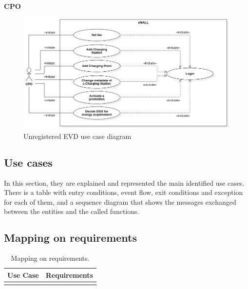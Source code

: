 \textbf{CPO}
\begin{figure} [H]
    \begin{center}
        \includegraphics[width=0.9\linewidth]{Images/UseCaseDiagrams/CPO_use_case_diagram}
        \caption{Unregistered EVD use case diagram}
        \label{fig: cpo_diag}
    \end{center}
\end{figure}

\subsection{Use cases}
\label{subsec: use_cases}%
In this section, they are explained and represented the main identified use cases.
There is a table with entry conditions, event flow, exit conditions and exception for each of them, and a sequence diagram
that shows the messages exchanged between the entities and the called functions.

\subsection{Mapping on requirements}
\label{subsec: map_on_req}%
\setcounter{mr}{1}
\newcommand{\cmr}{\themr\stepcounter{mr}}
\begin{center}
    \begin{longtable}{|l|l|}
        \hline
        \textbf{Use Case} & \textbf{Requirements} \\
        \hline
        \caption{Mapping on requirements.}
        \label{tab: map_on_req}
    \end{longtable}
\end{center}


